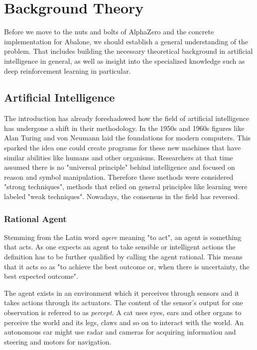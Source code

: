 \chapter{Background Theory}
\label{background-theory}
Before we move to the nuts and bolts of AlphaZero and the concrete implementation for Abalone, we should establish a general understanding of the problem. That includes building the necessary theoretical background in artificial intelligence in general, as well as insight into the specialized knowledge such as deep reinforcement learning in particular.

\section{Artificial Intelligence}
The introduction has already foreshadowed how the field of artificial intelligence has undergone a shift in their methodology. In the 1950s and 1960s figures like Alan Turing and von Neumann laid the foundations for modern computers. This sparked the idea one could create programs for these new machines that have similar abilities like humans and other organisms. Researchers at that time assumed there is no "universal principle" behind intelligence and focused on reason and symbol manipulation. Therefore these methods were considered "strong techniques", methods that relied on general principles like learning were labeled "weak techniques". Nowadays, the consensus in the field has reversed. \cite[cf. p. 8f.]{sutton_reinforcement_2018}


\subsection{Rational Agent}
Stemming from the Latin word \textit{agere} meaning "to act", an agent is something that acts. As one expects an agent to take sensible or intelligent actions the definition has to be further qualified by calling the agent rational. This means that it acts so as "to achieve the best outcome or, when there is uncertainty, the best expected outcome". \cite[p. 36]{russell_artificial_2021}

The agent exists in an environment which it perceives through sensors and it takes actions through its actuators. The content of the sensor's output for one observation is referred to as \textit{percept}. A cat uses eyes, ears and other organs to perceive the world and its legs, claws and so on to interact with the world. An autonomous car might use radar and cameras for acquiring information and steering and motors for navigation.

